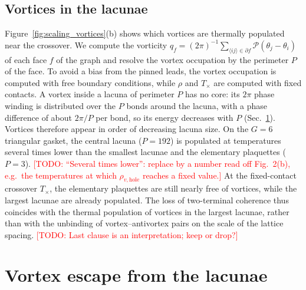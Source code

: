 \documentclass[aps,prb,twocolumn,superscriptaddress,floatfix]{revtex4-2}
\newcommand{\todo}[1]{\textcolor{red}{[TODO: #1]}}
\begin{document}
\subsection{Vortices in the lacunae}

Figure~\ref{fig:scaling_vortices}(b) shows which vortices are thermally
populated near the crossover. We compute the vorticity
$q_f = (2\pi)^{-1}\sum_{\langle ij\rangle \in \partial f}\mathcal{P}(\theta_j - \theta_i)$
of each face $f$ of the graph and resolve the vortex occupation by the
perimeter $P$ of the face. To avoid a bias from the pinned leads, the vortex
occupation is computed with free boundary conditions, while $\rho$ and
$T_\times$ are computed with fixed contacts. A vortex inside a lacuna of
perimeter $P$ has no core: its $2\pi$ phase winding is distributed over the
$P$ bonds around the lacuna, with a phase difference of about $2\pi/P$ per
bond, so its energy decreases with $P$ (Sec.~\ref{sec:vortex_escape}).
Vortices therefore appear in order of decreasing lacuna size. On the $G = 6$
triangular gasket, the central lacuna ($P = 192$) is populated at temperatures
several times lower than the smallest lacunae and the elementary plaquettes
($P = 3$).
\todo{``Several times lower'': replace by a number read off Fig.~2(b), e.g.\
the temperatures at which $\rho_{v,\mathrm{hole}}$ reaches a fixed value.}
At the fixed-contact crossover $T_\times$, the elementary plaquettes are still
nearly free of vortices, while the largest lacunae are already populated. The
loss of two-terminal coherence thus coincides with the thermal population of
vortices in the largest lacunae, rather than with the unbinding of
vortex--antivortex pairs on the scale of the lattice spacing.
\todo{Last clause is an interpretation; keep or drop?}

\section{Vortex escape from the lacunae}
\label{sec:vortex_escape}
\end{document}
